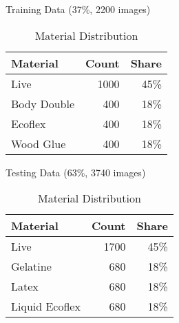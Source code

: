 \begin{table}[htb]
    \centering

    \begin{minipage}[r]{0.45\textwidth}
        \centering Training Data (37\%, 2200 images) 
        
        \smallskip
        \begin{tabular}{ l  r  r} \hline
            Material    & Count & Share \\ \hline
            Live        &  1000 &  45\% \\
            Body Double &   400 &  18\% \\
            Ecoflex     &   400 &  18\% \\
            Wood Glue   &   400 &  18\% \\ \hline
        \end{tabular}
    \end{minipage}
    \hfill
    \begin{minipage}[r]{0.45\textwidth}
        \centering Testing Data (63\%, 3740 images)
        
        \smallskip
        \begin{tabular}{ l  r  r } \hline
            Material        & Count & Share \\ \hline
            Live            &  1700 & 45\%  \\
            Gelatine        &   680 & 18\%  \\
            Latex           &   680 & 18\%  \\
            Liquid Ecoflex  &   680 & 18\%  \\ \hline
        \end{tabular}
    \end{minipage}

    \caption{Material Distribution}
    \label{tbl:dataset_materials}
\end{table}
